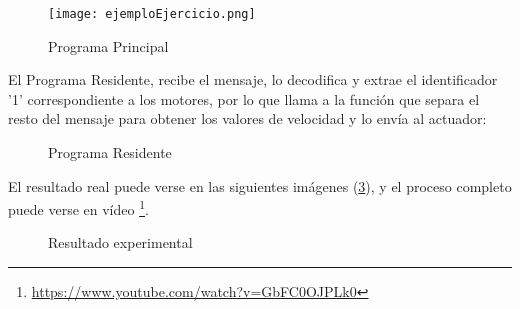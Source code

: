 \begin{figure}[h]
	\centering
	\texttt{[image: ejemploEjercicio.png]}
	\label{img:ProgramaPrincipal}
	\caption{Programa Principal}
\end{figure} 
 
El Programa Residente, recibe el mensaje, lo decodifica y extrae el identificador '1' correspondiente a los motores, por lo que llama a la función que separa el resto del mensaje para obtener los valores de velocidad y lo envía al actuador:

\begin{figure}[H]
	\centering
	\begin{subfigure}
		[Extraer el identificador]{
			\texttt{[image: ejemploEjercicio2.png]}
			\label{img:ejemplo2}}
	\end{subfigure}
	\begin{subfigure}
		[Decodificar mensaje completo]{
			\texttt{[image: ejemploEjercicio3.png]}
			\label{img:ejemplo3}}
	\end{subfigure}
	\label{img:ProgramaResidente}
	\caption{Programa Residente}
\end{figure}

El resultado real puede verse en las siguientes imágenes (\ref{img:Resultadoexperimental}), y el proceso completo puede verse en vídeo \footnote{\href{https://www.youtube.com/watch?v=GbFC0OJPLk0}{https://www.youtube.com/watch?v=GbFC0OJPLk0}}.


\begin{figure}[H]
	\centering
	\begin{subfigure}[b]
		[Ejecución programa Principal]{
			\centering
			\texttt{[image: ejemploEjercicio4.png]}
			\label{img:ejemplo4}}
	\end{subfigure}
\newline
	\begin{subfigure}[b]
		[mBot]{
			\centering
			\texttt{[image: ejemploEjercicio5.png]}
			\label{img:ejemplo5}}
	\end{subfigure}	
	\caption{Resultado experimental}
	\label{img:Resultadoexperimental}
\end{figure}